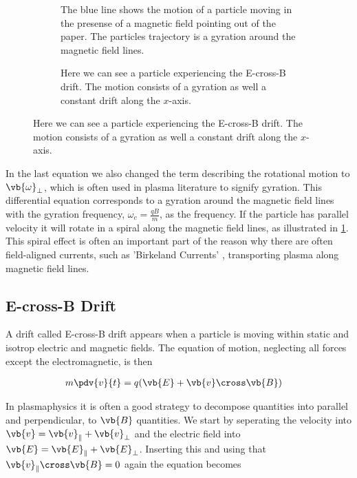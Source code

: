 		\begin{figure}
			\centering
			\begin{subfigure}{0.45\textwidth}
				
				\caption{The blue line shows the motion of a particle moving in the presense of a magnetic
				field pointing out of the paper. The particles trajectory is a gyration around the magnetic field lines.}
				\label{fig:gyration}
			\end{subfigure}
			\begin{subfigure}{0.45\textwidth}
				\caption{Here we can see a particle experiencing the E-cross-B drift. The motion consists of a gyration
				as well a constant drift along the \(x\)-axis.}
				\label{fig:EcrossB}
			\end{subfigure}
		\end{figure}


		In the last equation we also changed the term describing the rotational motion
		to \(\vb{\omega}_\perp\), which is often used in plasma literature to
		signify gyration.
		This differential equation corresponds to a gyration around the magnetic field lines
		with the gyration frequency, \(\omega_c = \frac{qB}{m}\), as the frequency. If the particle
		has parallel velocity it will rotate in a spiral along the magnetic field lines, as illustrated in
		\cref{fig:gyration}. This spiral effect is often an important part of the reason why
		there are often field-aligned currents, such as 'Birkeland Currents' \citep{cummings_field-aligned_1967},
		transporting plasma along magnetic field lines.



	\subsection{E-cross-B Drift}
	A drift called E-cross-B drift appears when a particle is moving within static and isotrop
	electric and magnetic fields. The equation of motion, neglecting all forces
	except the electromagnetic, is then

	\begin{align}
		m\pdv{v}{t} &= q(\vb{E} + \vb{v}\cross\vb{B}) \label{eq:EcrossB}
	\end{align}

	In plasmaphysics it is often a good strategy to decompose quantities into
	parallel and perpendicular, to \(\vb{B}\) quantities. We start by seperating the
	velocity into \(\vb{v} = \vb{v}_\parallel + \vb{v}_\perp\) and the electric field
	into \(\vb{E} = \vb{E}_\parallel + \vb{E}_\perp\). Inserting this and using that \(\vb{v}_\parallel\cross\vb{B}=0\)
	again the equation becomes

